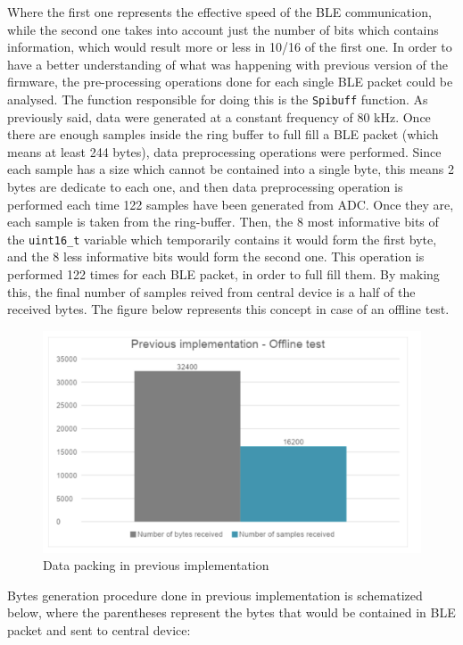 \documentclass{Configuration_Files/PoliMi3i_thesis}
\begin{document}
Where the first one represents the effective speed of the BLE communication, while the second one takes into account just the number of bits which contains information, which would result more or less in 10/16 of the first one. In order to have a better understanding of what was happening with previous version of the firmware, the pre-processing operations done for each single BLE packet could be analysed. The function responsible for doing this is the \texttt{Spibuff} function. As previously said, data were generated at a constant frequency of 80 kHz. Once there are enough samples inside the ring buffer to full fill a BLE packet (which means at least 244 bytes), data preprocessing operations were performed. Since each sample has a size which cannot be contained into a single byte, this means 2 bytes are dedicate to each one, and then data preprocessing operation is performed each time 122 samples have been generated from ADC. Once they are, each sample is taken from the ring-buffer. Then, the 8 most informative bits of the \texttt{uint16\_t} variable which temporarily contains it would form the first byte, and the 8 less informative bits would form the second one. This operation is performed 122 times for each BLE packet, in order to full fill them. By making this, the final number of samples reived from central device is a half of the received bytes. The figure below represents this concept in case of an offline test.

\begin{figure}[H]
    \centering
    \includegraphics[scale=0.7]{Shift Algorithm/Screenshot 2024-07-22 at 22.31.21.png}
    \caption{Data packing in previous implementation}
    \label{pairing_procedure_2}
\end{figure}

Bytes generation procedure done in previous implementation is schematized below, where the parentheses represent the bytes that would be contained in BLE packet and sent to central device:
\end{document}
